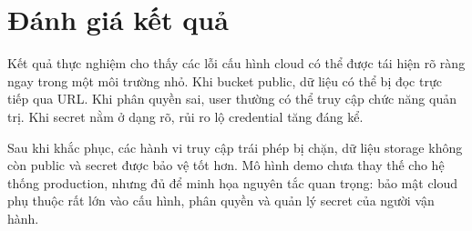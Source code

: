 

\section{Đánh giá kết quả}
Kết quả thực nghiệm cho thấy các lỗi cấu hình cloud có thể được tái hiện rõ ràng ngay trong một môi trường nhỏ. Khi bucket public, dữ liệu có thể bị đọc trực tiếp qua URL. Khi phân quyền sai, user thường có thể truy cập chức năng quản trị. Khi secret nằm ở dạng rõ, rủi ro lộ credential tăng đáng kể.

Sau khi khắc phục, các hành vi truy cập trái phép bị chặn, dữ liệu storage không còn public và secret được bảo vệ tốt hơn. Mô hình demo chưa thay thế cho hệ thống production, nhưng đủ để minh họa nguyên tắc quan trọng: bảo mật cloud phụ thuộc rất lớn vào cấu hình, phân quyền và quản lý secret của người vận hành.
